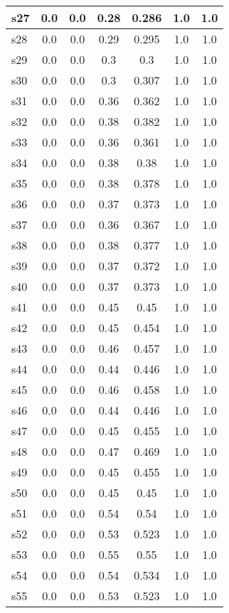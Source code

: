 \documentclass{article}
\begin{document}
\begin{tabular}{|l|c|c|c|c|c|c|}
s27 &0.0 & 0.0 & 0.28 & 0.286 & 1.0 & 1.0\\
\hline
s28 &0.0 & 0.0 & 0.29 & 0.295 & 1.0 & 1.0\\
\hline
s29 &0.0 & 0.0 & 0.3 & 0.3 & 1.0 & 1.0\\
\hline
s30 &0.0 & 0.0 & 0.3 & 0.307 & 1.0 & 1.0\\
\hline
s31 &0.0 & 0.0 & 0.36 & 0.362 & 1.0 & 1.0\\
\hline
s32 &0.0 & 0.0 & 0.38 & 0.382 & 1.0 & 1.0\\
\hline
s33 &0.0 & 0.0 & 0.36 & 0.361 & 1.0 & 1.0\\
\hline
s34 &0.0 & 0.0 & 0.38 & 0.38 & 1.0 & 1.0\\
\hline
s35 &0.0 & 0.0 & 0.38 & 0.378 & 1.0 & 1.0\\
\hline
s36 &0.0 & 0.0 & 0.37 & 0.373 & 1.0 & 1.0\\
\hline
s37 &0.0 & 0.0 & 0.36 & 0.367 & 1.0 & 1.0\\
\hline
s38 &0.0 & 0.0 & 0.38 & 0.377 & 1.0 & 1.0\\
\hline
s39 &0.0 & 0.0 & 0.37 & 0.372 & 1.0 & 1.0\\
\hline
s40 &0.0 & 0.0 & 0.37 & 0.373 & 1.0 & 1.0\\
\hline
s41 &0.0 & 0.0 & 0.45 & 0.45 & 1.0 & 1.0\\
\hline
s42 &0.0 & 0.0 & 0.45 & 0.454 & 1.0 & 1.0\\
\hline
s43 &0.0 & 0.0 & 0.46 & 0.457 & 1.0 & 1.0\\
\hline
s44 &0.0 & 0.0 & 0.44 & 0.446 & 1.0 & 1.0\\
\hline
s45 &0.0 & 0.0 & 0.46 & 0.458 & 1.0 & 1.0\\
\hline
s46 &0.0 & 0.0 & 0.44 & 0.446 & 1.0 & 1.0\\
\hline
s47 &0.0 & 0.0 & 0.45 & 0.455 & 1.0 & 1.0\\
\hline
s48 &0.0 & 0.0 & 0.47 & 0.469 & 1.0 & 1.0\\
\hline
s49 &0.0 & 0.0 & 0.45 & 0.455 & 1.0 & 1.0\\
\hline
s50 &0.0 & 0.0 & 0.45 & 0.45 & 1.0 & 1.0\\
\hline
s51 &0.0 & 0.0 & 0.54 & 0.54 & 1.0 & 1.0\\
\hline
s52 &0.0 & 0.0 & 0.53 & 0.523 & 1.0 & 1.0\\
\hline
s53 &0.0 & 0.0 & 0.55 & 0.55 & 1.0 & 1.0\\
\hline
s54 &0.0 & 0.0 & 0.54 & 0.534 & 1.0 & 1.0\\
\hline
s55 &0.0 & 0.0 & 0.53 & 0.523 & 1.0 & 1.0\\

\end{tabular}
\end{document}
